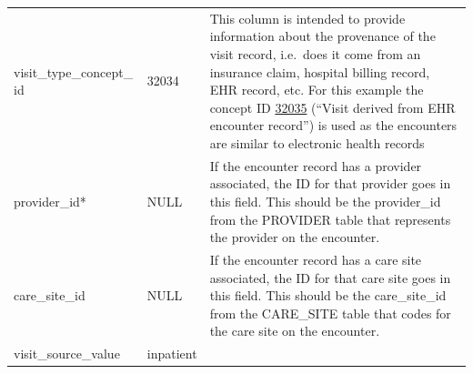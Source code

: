 \documentclass[11pt]{book}
\theoremstyle{definition}
\theoremstyle{definition}
\theoremstyle{definition}
\theoremstyle{remark}
\begin{document}
\begin{longtable}[]{@{}lll@{}}
\begin{minipage}[t]{0.28\columnwidth}\raggedright
visit\_type\_concept\_ id\strut
\end{minipage} & \begin{minipage}[t]{0.15\columnwidth}\raggedright
32034\strut
\end{minipage} & \begin{minipage}[t]{0.49\columnwidth}\raggedright
This column is intended to provide information about the provenance of the visit record, i.e.~does it come from an insurance claim, hospital billing record, EHR record, etc. For this example the concept ID \href{http://athena.ohdsi.org/search-terms/terms/32035}{32035} (``Visit derived from EHR encounter record'') is used as the encounters are similar to electronic health records\strut
\end{minipage}\tabularnewline
\begin{minipage}[t]{0.28\columnwidth}\raggedright
provider\_id*\strut
\end{minipage} & \begin{minipage}[t]{0.15\columnwidth}\raggedright
NULL\strut
\end{minipage} & \begin{minipage}[t]{0.49\columnwidth}\raggedright
If the encounter record has a provider associated, the ID for that provider goes in this field. This should be the provider\_id from the PROVIDER table that represents the provider on the encounter.\strut
\end{minipage}\tabularnewline
\begin{minipage}[t]{0.28\columnwidth}\raggedright
care\_site\_id\strut
\end{minipage} & \begin{minipage}[t]{0.15\columnwidth}\raggedright
NULL\strut
\end{minipage} & \begin{minipage}[t]{0.49\columnwidth}\raggedright
If the encounter record has a care site associated, the ID for that care site goes in this field. This should be the care\_site\_id from the CARE\_SITE table that codes for the care site on the encounter.\strut
\end{minipage}\tabularnewline
\begin{minipage}[t]{0.28\columnwidth}\raggedright
visit\_source\_value\strut
\end{minipage} & \begin{minipage}[t]{0.15\columnwidth}\raggedright
inpatient\strut
\end{minipage} & \begin{minipage}[t]{0.49\columnwidth}\raggedright

\end{minipage}
\end{longtable}
\end{document}

